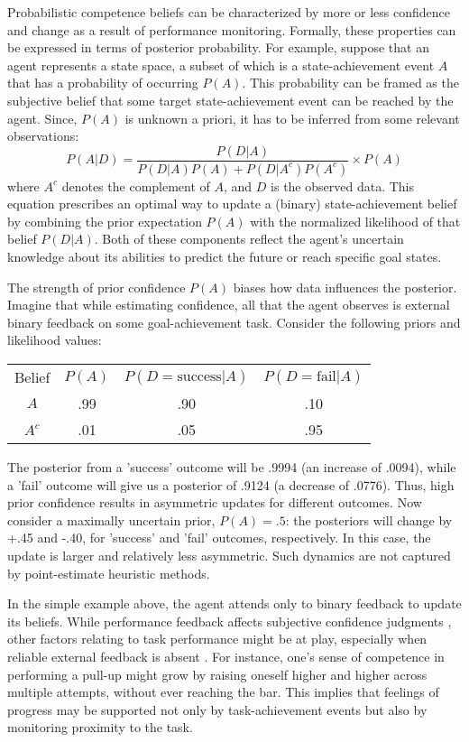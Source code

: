 Probabilistic competence beliefs can be characterized by more or less confidence and change as a result of performance monitoring. Formally, these properties can be expressed in terms of posterior probability. For example, suppose that an agent represents a state space, a subset of which is a state-achievement event $A$ that has a probability of occurring $P(A)$. This probability can be framed as the subjective belief that some target state-achievement event can be reached by the agent. Since, $P(A)$ is unknown a priori, it has to be inferred from some relevant observations:
\begin{equation}
    P(A|D) = \frac{P(D|A)}{P(D|A)P(A) + P(D|A^c)P(A^c)} \times P(A)
\end{equation}
where $A^c$ denotes the complement of $A$, and $D$ is the observed data. This equation prescribes an optimal way to update a (binary) state-achievement belief by combining the prior expectation $P(A)$ with the normalized likelihood of that belief $P(D|A)$. Both of these components reflect the agent's uncertain knowledge about its abilities to predict the future or reach specific goal states.

The strength of prior confidence $P(A)$ biases how data influences the posterior. Imagine that while estimating confidence, all that the agent observes is external binary feedback on some goal-achievement task. Consider the following priors and likelihood values:
\begin{center}
\begin{tabular}{c c c c}
Belief & $P(A)$ & $P(D=\mathrm{success}|A)$ & $P(D=\mathrm{fail}|A)$ \\ 
$A$    & .99    & .90                       & .10        \\  
$A^c$  & .01    & .05                       & .95         
\end{tabular}
\end{center}
The posterior from a 'success' outcome will be .9994 (an increase of .0094), while a 'fail' outcome will give us a posterior of .9124 (a decrease of .0776). Thus, high prior confidence results in asymmetric updates for different outcomes. Now consider a maximally uncertain prior, $P(A) = .5$: the posteriors will change by +.45 and -.40, for 'success' and 'fail' outcomes, respectively. In this case, the update is larger and relatively less asymmetric. Such dynamics are not captured by point-estimate heuristic methods. 

In the simple example above, the agent attends only to binary feedback to update its beliefs. While performance feedback affects subjective confidence judgments \cite{marti_certainty_2018,rouault_forming_2019}, other factors relating to task performance might be at play, especially when reliable external feedback is absent \cite[e.g.,][]{rouault_forming_2019,holm_episodic_2019,locke_performance_2020}. For instance, one's sense of competence in performing a pull-up might grow by raising oneself higher and higher across multiple attempts, without ever reaching the bar. This implies that feelings of progress may be supported not only by task-achievement events but also by monitoring proximity to the task.

